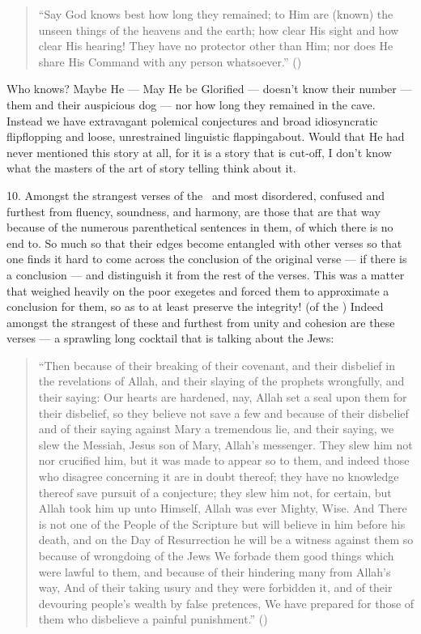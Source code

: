 \documentclass[12pt]{memoir}
\begin{document}
\begin{quote}
“Say God knows best how long they remained;
to Him are (known) the unseen things of the heavens and the earth;
how clear His sight and how clear His hearing!
They have no protector other than Him;
nor does He share His Command with any person whatsoever.”
()
\end{quote}

Who knows? Maybe He — May He be Glorified — doesn’t know their number —
them and their auspicious dog — nor how long they remained in the cave.
Instead we have extravagant polemical conjectures
and broad idiosyncratic flip\–flopping and loose,
unrestrained linguistic flapping\–about.
Would that He had never mentioned this story at all,
for it is a story that is cut-off,
I don’t know what the masters of the art of story telling
think about it.

10. Amongst the strangest verses of the \Quran\ and most disordered,
confused and furthest from fluency, soundness, and harmony,
are those that are that way because of the numerous
parenthetical sentences in them, of which there is no end to.
So much so that their edges become entangled with other verses so that
one finds it hard to come across the conclusion of the original verse —
if there is a conclusion — and distinguish it from the rest of the verses.
This was a matter that weighed heavily on the poor exegetes
and forced them to approximate a conclusion for them,
so as to at least preserve the integrity! (of the \Quran)
Indeed amongst the strangest of these and furthest from unity
and cohesion are these verses —
a sprawling long cocktail that is talking about the Jews:

\begin{quote}
“Then because of their breaking of their covenant,
and their disbelief in the revelations of Allah,
and their slaying of the prophets wrongfully, and their saying:
Our hearts are hardened, nay, Allah set a seal upon them for their disbelief,
so they believe not save a few and because of their disbelief
and of their saying against Mary a tremendous lie,
and their saying, we slew the Messiah, Jesus son of Mary, Allah’s messenger.
They slew him not nor crucified him, but it was made to appear so to them,
and indeed those who disagree concerning it are in doubt thereof;
they have no knowledge thereof save pursuit of a conjecture;
they slew him not, for certain, but Allah took him up unto Himself,
Allah was ever Mighty, Wise.
And There is not one of the People of the Scripture
but will believe in him before his death,
and on the Day of Resurrection he will be a witness against them
so because of wrongdoing of the Jews We forbade them good things
which were lawful to them,
and because of their hindering many from Allah’s way,
And of their taking usury and they were forbidden it,
and of their devouring people’s wealth by false pretences,
We have prepared for those of them who disbelieve a painful punishment.”
()
\end{quote}
\end{document}
